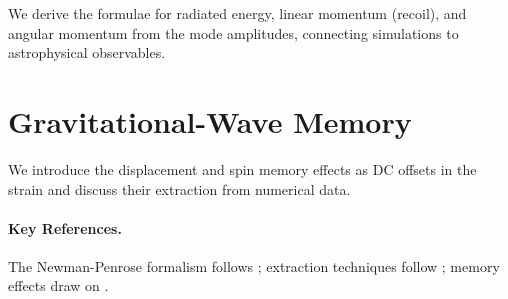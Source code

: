 We derive the formulae for radiated energy, linear momentum (recoil), and
angular momentum from the mode amplitudes, connecting simulations to
astrophysical observables.

\section{Gravitational-Wave Memory\starmark{}}
\label{sec:we-memory}

We introduce the displacement and spin memory effects as DC offsets in the
strain and discuss their extraction from numerical data.

\paragraph{Key References.}
The Newman-Penrose formalism follows \cite{Newman1962,Wald1984}; extraction
techniques follow \cite{Reisswig2011}; memory effects draw on
\cite{Christodoulou1991,Favata2010}.

